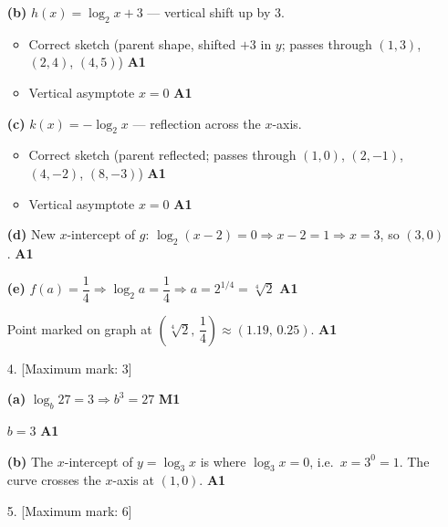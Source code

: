 \documentclass[12pt, twoside]{article}
\begin{document}
\begin{enumerate}[itemsep=0.3cm]
\smallskip

\textbf{(b)} $h(x) = \log_2 x + 3$ \quad — vertical shift up by $3$.

\begin{itemize}\setlength\itemsep{0pt}
  \item Correct sketch (parent shape, shifted $+3$ in $y$; passes through
  $(1, 3)$, $(2, 4)$, $(4, 5)$) \hfill \textbf{A1}
  \item Vertical asymptote $x = 0$ \hfill \textbf{A1}
\end{itemize}

\smallskip

\textbf{(c)} $k(x) = -\log_2 x$ \quad — reflection across the $x$-axis.

\begin{itemize}\setlength\itemsep{0pt}
  \item Correct sketch (parent reflected; passes through $(1, 0)$,
  $(2, -1)$, $(4, -2)$, $(8, -3)$) \hfill \textbf{A1}
  \item Vertical asymptote $x = 0$ \hfill \textbf{A1}
\end{itemize}

\smallskip

\textbf{(d)} New $x$-intercept of $g$: $\log_2(x - 2) = 0
\Rightarrow x - 2 = 1 \Rightarrow x = 3$, so $(3, 0)$. \hfill \textbf{A1}

\smallskip

\textbf{(e)} $f(a) = \dfrac{1}{4} \Rightarrow \log_2 a = \dfrac{1}{4}
\Rightarrow a = 2^{1/4} = \sqrt[4]{2}$ \hfill \textbf{A1}

Point marked on graph at $\left(\sqrt[4]{2},\, \dfrac{1}{4}\right)
\approx (1.19,\, 0.25)$. \hfill \textbf{A1}

\newpage

\item[4.] [Maximum mark: 3]

\textbf{(a)} $\log_b 27 = 3 \Rightarrow b^3 = 27$ \hfill \textbf{M1}

$b = 3$ \hfill \textbf{A1}

\smallskip

\textbf{(b)} The $x$-intercept of $y = \log_3 x$ is where $\log_3 x = 0$,
i.e.\ $x = 3^0 = 1$. The curve crosses the $x$-axis at $(1, 0)$.
\hfill \textbf{A1}

\item[5.] [Maximum mark: 6]


\end{enumerate}
\end{document}
